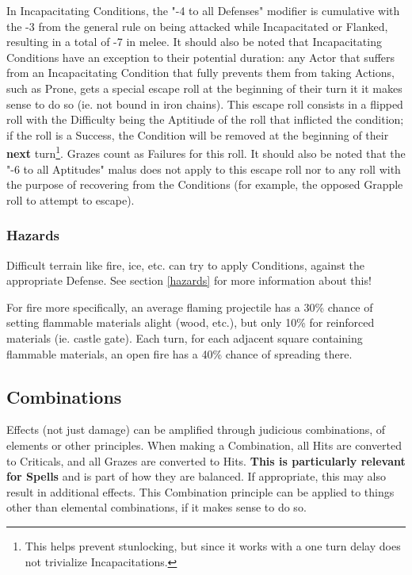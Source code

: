 In Incapacitating Conditions, the "-4 to all Defenses" modifier is cumulative with the -3 from the general rule on being attacked while Incapacitated or Flanked, resulting in a total of -7 in melee. It should also be noted that Incapacitating Conditions have an exception to their potential duration: any Actor that suffers from an Incapacitating Condition that fully prevents them from taking Actions, such as Prone, gets a special escape roll at the beginning of their turn it it makes sense to do so (ie. not bound in iron chains). This escape roll consists in a flipped roll with the Difficulty being the Aptitiude of the roll that inflicted the condition; if the roll is a Success, the Condition will be removed at the beginning of their \textbf{next} turn\footnote{This helps prevent stunlocking, but since it works with a one turn delay does not trivialize Incapacitations.}. Grazes count as Failures for this roll. It should also be noted that the "-6 to all Aptitudes" malus does not apply to this escape roll nor to any roll with the purpose of recovering from the Conditions (for example, the opposed Grapple roll to attempt to escape).


\subsubsection{Hazards}

Difficult terrain like fire, ice, etc. can try to apply Conditions, against the appropriate Defense. See section \ref{hazards} for more information about this!

For fire more specifically, an average flaming projectile has a 30\% chance of setting flammable materials alight (wood, etc.), but only 10\% for reinforced materials (ie. castle gate). Each turn, for each adjacent square containing flammable materials, an open fire has a 40\% chance of spreading there.



\subsection{Combinations}

\label{combinations}

Effects (not just damage) can be amplified through judicious combinations, of elements or other principles. When making a Combination, all Hits are converted to Criticals, and all Grazes are converted to Hits. \textbf{This is particularly relevant for Spells} and is part of how they are balanced. If appropriate, this may also result in additional effects. This Combination principle can be applied to things other than elemental combinations, if it makes sense to do so.

